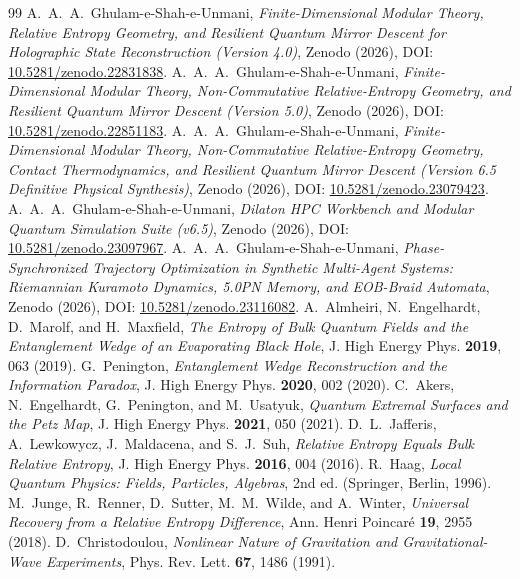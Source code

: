 \documentclass[11pt,a4paper,reqno]{article}
\theoremstyle{definition}
\numberwithin{equation}{section}
\begin{document}
\begin{thebibliography}{99}
 A.~A.~A.~Ghulam-e-Shah-e-Unmani, \emph{Finite-Dimensional Modular Theory, Relative Entropy Geometry, and Resilient Quantum Mirror Descent for Holographic State Reconstruction (Version 4.0)}, Zenodo (2026), DOI: \href{https://doi.org/10.5281/zenodo.22831838}{10.5281/zenodo.22831838}.
 A.~A.~A.~Ghulam-e-Shah-e-Unmani, \emph{Finite-Dimensional Modular Theory, Non-Commutative Relative-Entropy Geometry, and Resilient Quantum Mirror Descent (Version 5.0)}, Zenodo (2026), DOI: \href{https://doi.org/10.5281/zenodo.22851183}{10.5281/zenodo.22851183}.
 A.~A.~A.~Ghulam-e-Shah-e-Unmani, \emph{Finite-Dimensional Modular Theory, Non-Commutative Relative-Entropy Geometry, Contact Thermodynamics, and Resilient Quantum Mirror Descent (Version 6.5 Definitive Physical Synthesis)}, Zenodo (2026), DOI: \href{https://doi.org/10.5281/zenodo.23079423}{10.5281/zenodo.23079423}.
 A.~A.~A.~Ghulam-e-Shah-e-Unmani, \emph{Dilaton HPC Workbench and Modular Quantum Simulation Suite (v6.5)}, Zenodo (2026), DOI: \href{https://doi.org/10.5281/zenodo.23097967}{10.5281/zenodo.23097967}.
 A.~A.~A.~Ghulam-e-Shah-e-Unmani, \emph{Phase-Synchronized Trajectory Optimization in Synthetic Multi-Agent Systems: Riemannian Kuramoto Dynamics, 5.0PN Memory, and EOB-Braid Automata}, Zenodo (2026), DOI: \href{https://doi.org/10.5281/zenodo.23116082}{10.5281/zenodo.23116082}.
 A.~Almheiri, N.~Engelhardt, D.~Marolf, and H.~Maxfield, \emph{The Entropy of Bulk Quantum Fields and the Entanglement Wedge of an Evaporating Black Hole}, J. High Energy Phys. \textbf{2019}, 063 (2019).
 G.~Penington, \emph{Entanglement Wedge Reconstruction and the Information Paradox}, J. High Energy Phys. \textbf{2020}, 002 (2020).
 C.~Akers, N.~Engelhardt, G.~Penington, and M.~Usatyuk, \emph{Quantum Extremal Surfaces and the Petz Map}, J. High Energy Phys. \textbf{2021}, 050 (2021).
 D.~L.~Jafferis, A.~Lewkowycz, J.~Maldacena, and S.~J.~Suh, \emph{Relative Entropy Equals Bulk Relative Entropy}, J. High Energy Phys. \textbf{2016}, 004 (2016).
 R.~Haag, \emph{Local Quantum Physics: Fields, Particles, Algebras}, 2nd ed. (Springer, Berlin, 1996).
 M.~Junge, R.~Renner, D.~Sutter, M.~M.~Wilde, and A.~Winter, \emph{Universal Recovery from a Relative Entropy Difference}, Ann. Henri Poincar\'e \textbf{19}, 2955 (2018).
 D.~Christodoulou, \emph{Nonlinear Nature of Gravitation and Gravitational-Wave Experiments}, Phys. Rev. Lett. \textbf{67}, 1486 (1991).

\end{thebibliography}
\end{document}
